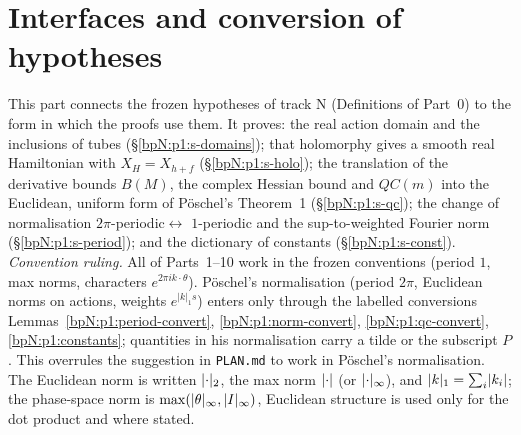 \section{Interfaces and conversion of hypotheses}\label{bpN:p1}
\begingroup\sloppy

This part connects the frozen hypotheses of track N (Definitions of Part~0) to the form in which the proofs use them. It proves: the real
action domain and the inclusions of tubes (\S\ref{bpN:p1:s-domains}); that holomorphy gives a smooth real Hamiltonian with
$X_H=X_{h+f}$ (\S\ref{bpN:p1:s-holo}); the translation of the derivative bounds $B(M)$, the complex Hessian bound and $QC(m)$ into the
Euclidean, uniform form of P\"oschel's Theorem~1 (\S\ref{bpN:p1:s-qc}); the change of normalisation $2\pi$-periodic$\leftrightarrow$
$1$-periodic and the sup-to-weighted Fourier norm (\S\ref{bpN:p1:s-period}); and the dictionary of constants (\S\ref{bpN:p1:s-const}).
\emph{Convention ruling.} All of Parts~1--10 work in the frozen conventions (period $1$, max norms, characters $e^{2\pi ik\cdot\theta}$). P\"oschel's
normalisation (period $2\pi$, Euclidean norms on actions, weights $e^{|k|_1s}$) enters only through the labelled conversions
Lemmas~\ref{bpN:p1:period-convert}, \ref{bpN:p1:norm-convert}, \ref{bpN:p1:qc-convert}, \ref{bpN:p1:constants}; quantities in his normalisation carry
a tilde or the subscript $P$. This overrules the suggestion in \texttt{PLAN.md} to work in P\"oschel's normalisation. The Euclidean norm is
written $\lvert \cdot\rvert_2$, the max norm $\lvert \cdot\rvert$ (or $\lvert \cdot\rvert_\infty$), and $\lvert k\rvert_1=\sum_i\lvert k_i\rvert$; the phase-space norm is
$\max(\lvert \theta\rvert_\infty,\lvert I\rvert_\infty)$, Euclidean structure is used only for the dot product and where stated.

